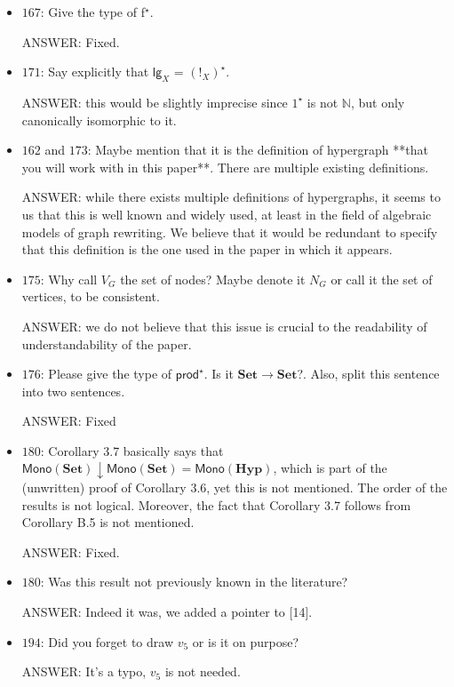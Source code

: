 \documentclass[english,11pt,a4paper]{article}
\begin{document}
\begin{itemize}
\item $167$: Give the type of f$^\star$.

ANSWER: Fixed.


\item $171$: Say explicitly that $\mathsf{lg}_X$ = $(!_X)^\star$.

ANSWER: this would be slightly imprecise since $1^\star$ is not $\mathbb{N}$, but only canonically isomorphic to it.

\item $162$ and $173$: Maybe mention that it is the definition of hypergraph **that you will work with in this paper**. There are multiple existing definitions.

ANSWER: while there exists multiple definitions of hypergraphs, it seems to us that this is well known and widely used, at least in the field of algebraic models of graph rewriting. We believe that it would be redundant to specify that this definition is the one used in the paper in which it appears.

\item $175$: Why call $V_G$ the set of nodes? Maybe denote it $N_G$ or call it the set of vertices, to be consistent.

ANSWER: we do not believe that this issue is crucial to the readability of understandability of the paper.

\item $176$: Please give the type of $\mathsf{prod}^\star$. Is it $\mathbf{Set} \to \mathbf{Set}$?. Also, split this sentence into two sentences.

ANSWER: Fixed


\item $180$: Corollary 3.7 basically says that $\mathsf{Mono}(\mathbf{Set}) \downarrow \mathsf{Mono}(\mathbf{Set}) = \mathsf{Mono}(\mathbf{Hyp})$, which is part of the (unwritten) proof of Corollary 3.6, yet this is not mentioned. The order of the results is not logical. Moreover, the fact that Corollary 3.7 follows from Corollary B.5 is not mentioned.

ANSWER: Fixed.

\item $180$: Was this result not previously known in the literature?

ANSWER: Indeed it was, we added a pointer to [14].

\item $194$: Did you forget to draw $v_5$ or is it on purpose?

ANSWER: It's a typo, $v_5$ is not needed.


\end{itemize}
\end{document}
